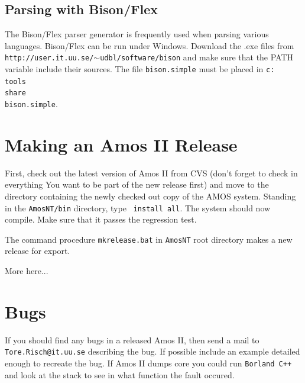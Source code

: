 \subsection{Parsing with Bison/Flex}
The Bison/Flex parser generator is frequently used when parsing
various languages. Bison/Flex can be run under Windows. Download the
.exe files from {\tt http://user.it.uu.se/$\sim$udbl/software/bison} and
make sure that the PATH variable include their sources. The file {\tt bison.simple} must be placed in {\tt c:\\tools\\share\\bison.simple}. 

\section{Making an Amos II Release}
\label{release}

First, check out the latest version of Amos II from CVS (don't forget
to check in everything You want to be part of the new release first)
and move to the directory containing the newly checked out copy of the
AMOS system.  Standing in the {\tt AmosNT/bin} directory, type {\tt
install all}. The system should now compile. Make sure that it passes
the regression test. 

The command procedure {\tt mkrelease.bat} in {\tt AmosNT} root
directory makes a new release for export.

More here...

\section{Bugs}

If you should find any bugs in a released Amos II, then send a mail to
{\tt Tore.Risch@it.uu.se} describing the bug. If possible include 
an example detailed enough to recreate the bug. If Amos II dumps core
you could run {\tt Borland C++} and look at the stack to see in what
function the fault occured. 


